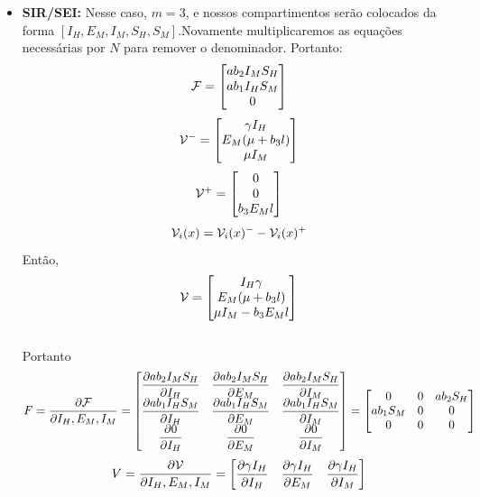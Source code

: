 \documentclass[12pt]{article}
\begin{document}
\begin{itemize}
\item \textbf{SIR/SEI:}
Nesse caso, $m=3$, e nossos compartimentos serão colocados da forma $[I_H, E_M, I_M, S_H, S_M]$.Novamente multiplicaremos as equações necessárias por $N$ para remover o denominador. Portanto:
$$ {\cal F} =\begin{bmatrix}
a  b_2  I_M  S_H \\
a b_1 I_H S_M\\
0\\
\end{bmatrix} $$
$$
{\cal V^-} = \begin{bmatrix}
\gamma I_H\\
E_M (\mu + b_3 l)\\
\mu I_M
\end{bmatrix}
$$
$$
{\cal V^+} = \begin{bmatrix}
0\\
0\\
b_3 E_M l\\
\end{bmatrix}
$$
$${\cal V}_i (x) = {\cal V}_i(x)^{-} - {\cal V}_i(x)^+$$
Então,
$$
{\cal V} =
\begin{bmatrix}
I_H \gamma \\
E_M (\mu + b_3 l)\\
\mu I_M - b_3 E_M l\\
\end{bmatrix}
$$
\\
Portanto
$$ F = \dfrac{\partial{\cal F}}{\partial I_H, E_M, I_M} =\begin{bmatrix}
\dfrac{\partial ab_2 I_M S_H}{\partial I_H} & \dfrac{\partial ab_2 I_M S_H}{\partial E_M} & \dfrac{\partial ab_2 I_M S_H}{\partial I_M}\\
\dfrac{\partial ab_1 I_H S_M}{\partial I_H} & \dfrac{\partial ab_1 I_H S_M}{\partial E_M} & \dfrac{\partial ab_1 I_H S_M}{\partial I_M}\\
\dfrac{\partial 0}{\partial I_H} & \dfrac{\partial 0}{\partial E_M} & \dfrac{\partial 0}{\partial I_M}\\
\end{bmatrix} = 
\begin{bmatrix}
0 & 0 & ab_2 S_H\\
ab_1 S_M & 0 & 0\\
0 & 0 & 0
\end{bmatrix}$$
$$ V = \dfrac{\partial{\cal V}}{\partial I_H, E_M, I_M} =\begin{bmatrix}
\dfrac{\partial \gamma I_H}{\partial I_H} & \dfrac{\partial \gamma I_H}{\partial E_M} & \dfrac{\partial \gamma I_H}{\partial I_M}\\

\end{bmatrix}$$
\end{itemize}
\end{document}
